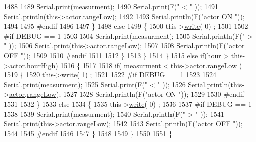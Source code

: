 \begin{DoxyCode}
1488 
1489                 Serial.print(measurment);
1490                 Serial.print(F(\textcolor{stringliteral}{" < "} ));
1491                 Serial.println(this->\hyperlink{class_cool_board_actor_a8f190db9f7a39fddbcef7f152da970e9}{actor}.\hyperlink{struct_cool_board_actor_1_1state_a43f891c9fb3bb63575c27cec860de55a}{rangeLow});
1492 
1493                 Serial.println(F(\textcolor{stringliteral}{"actor ON "}));
1494 
1495 \textcolor{preprocessor}{            #endif  }
1496 
1497             \}
1498             \textcolor{keywordflow}{else} 
1499             \{
1500                 this->\hyperlink{class_cool_board_actor_a958786ff01ea1056ee72c72d439f86da}{write}( 0) ;
1501 
1502 \textcolor{preprocessor}{            #if DEBUG == 1 }
1503 
1504                 Serial.print(measurment);
1505                 Serial.println(F(\textcolor{stringliteral}{" > "} ));
1506                 Serial.print(this->\hyperlink{class_cool_board_actor_a8f190db9f7a39fddbcef7f152da970e9}{actor}.\hyperlink{struct_cool_board_actor_1_1state_a43f891c9fb3bb63575c27cec860de55a}{rangeLow});
1507 
1508                 Serial.println(F(\textcolor{stringliteral}{"actor OFF "}));
1509 
1510 \textcolor{preprocessor}{            #endif  }
1511                 
1512             \}
1513         \}
1514     \}
1515     \textcolor{keywordflow}{else} \textcolor{keywordflow}{if}(hour > this->\hyperlink{class_cool_board_actor_a8f190db9f7a39fddbcef7f152da970e9}{actor}.\hyperlink{struct_cool_board_actor_1_1state_acd1af3ac2382258a5b05497d814adc01}{hourHigh})
1516     \{
1517 
1518         \textcolor{keywordflow}{if}( measurment < this->\hyperlink{class_cool_board_actor_a8f190db9f7a39fddbcef7f152da970e9}{actor}.\hyperlink{struct_cool_board_actor_1_1state_a43f891c9fb3bb63575c27cec860de55a}{rangeLow} )
1519         \{
1520             this->\hyperlink{class_cool_board_actor_a958786ff01ea1056ee72c72d439f86da}{write}( 1) ;
1521 
1522 \textcolor{preprocessor}{        #if DEBUG == 1 }
1523 
1524             Serial.print(measurment);
1525             Serial.print(F(\textcolor{stringliteral}{" < "} ));
1526             Serial.println(this->\hyperlink{class_cool_board_actor_a8f190db9f7a39fddbcef7f152da970e9}{actor}.\hyperlink{struct_cool_board_actor_1_1state_a43f891c9fb3bb63575c27cec860de55a}{rangeLow});
1527 
1528             Serial.println(F(\textcolor{stringliteral}{"actor ON "}));
1529 
1530 \textcolor{preprocessor}{        #endif  }
1531 
1532         \}
1533         \textcolor{keywordflow}{else} 
1534         \{
1535             this->\hyperlink{class_cool_board_actor_a958786ff01ea1056ee72c72d439f86da}{write}( 0) ;
1536 
1537 \textcolor{preprocessor}{        #if DEBUG == 1 }
1538 
1539             Serial.print(measurment);
1540             Serial.println(F(\textcolor{stringliteral}{" > "} ));
1541             Serial.print(this->\hyperlink{class_cool_board_actor_a8f190db9f7a39fddbcef7f152da970e9}{actor}.\hyperlink{struct_cool_board_actor_1_1state_a43f891c9fb3bb63575c27cec860de55a}{rangeLow});
1542 
1543             Serial.println(F(\textcolor{stringliteral}{"actor OFF "}));
1544 
1545 \textcolor{preprocessor}{        #endif  }
1546             
1547         \}
1548     
1549     \}
1550 
1551 \}
\end{DoxyCode}
